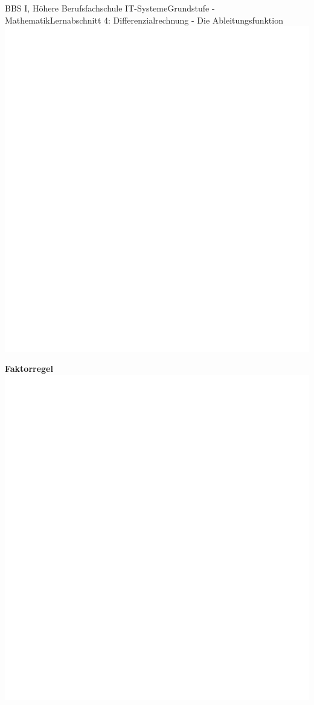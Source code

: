 \documentclass[11pt,twocolumn,oneside,openany,headings=optiontotoc,11pt,numbers=noenddot]{article}
\begin{document}
\begin{worksheet}{BBS I, Höhere Berufsfachschule IT-Systeme}{Grundstufe - Mathematik}{Lernabschnitt 4: Differenzialrechnung - Die Ableitungsfunktion}
		\includegraphics[scale=0.1]{../../empty.jpg}\\
		\par
		\textbf{Faktorregel}\\
		\includegraphics[scale=0.1]{../../empty.jpg}\\

\end{worksheet}
\end{document}

